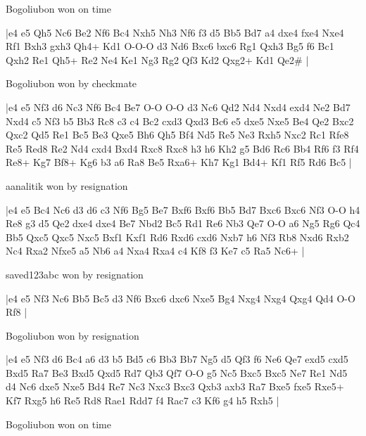 \showboard

Bogoliubon won on time

\makegametitle
|e4 e5 Qh5 Nc6 Be2 Nf6 Bc4 Nxh5 Nh3 Nf6 f3 d5 Bb5 Bd7 a4 dxe4 fxe4 Nxe4 Rf1 Bxh3 gxh3 Qh4+ Kd1 O-O-O d3 Nd6 Bxc6 bxc6 Rg1 Qxh3 Bg5 f6 Bc1 Qxh2 Re1 Qh5+ Re2 Ne4 Ke1 Ng3 Rg2 Qf3 Kd2 Qxg2+ Kd1 Qe2\#  |

\showboard

Bogoliubon won by checkmate

\makegametitle
|e4 e5 Nf3 d6 Nc3 Nf6 Bc4 Be7 O-O O-O d3 Nc6 Qd2 Nd4 Nxd4 exd4 Ne2 Bd7 Nxd4 c5 Nf3 b5 Bb3 Rc8 c3 c4 Bc2 cxd3 Qxd3 Bc6 e5 dxe5 Nxe5 Be4 Qe2 Bxc2 Qxc2 Qd5 Re1 Bc5 Be3 Qxe5 Bh6 Qh5 Bf4 Nd5 Re5 Ne3 Rxh5 Nxc2 Rc1 Rfe8 Re5 Red8 Re2 Nd4 cxd4 Bxd4 Rxc8 Rxc8 h3 h6 Kh2 g5 Bd6 Rc6 Bb4 Rf6 f3 Rf4 Re8+ Kg7 Bf8+ Kg6 b3 a6 Ra8 Be5 Rxa6+ Kh7 Kg1 Bd4+ Kf1 Rf5 Rd6 Bc5  |

\showboard

aanalitik won by resignation

\makegametitle
|e4 e5 Bc4 Nc6 d3 d6 c3 Nf6 Bg5 Be7 Bxf6 Bxf6 Bb5 Bd7 Bxc6 Bxc6 Nf3 O-O h4 Re8 g3 d5 Qe2 dxe4 dxe4 Be7 Nbd2 Bc5 Rd1 Re6 Nb3 Qe7 O-O a6 Ng5 Rg6 Qc4 Bb5 Qxc5 Qxc5 Nxc5 Bxf1 Kxf1 Rd6 Rxd6 cxd6 Nxb7 h6 Nf3 Rb8 Nxd6 Rxb2 Nc4 Rxa2 Nfxe5 a5 Nb6 a4 Nxa4 Rxa4 c4 Kf8 f3 Ke7 c5 Ra5 Nc6+  |

\showboard

saved123abc won by resignation

\makegametitle
|e4 e5 Nf3 Nc6 Bb5 Bc5 d3 Nf6 Bxc6 dxc6 Nxe5 Bg4 Nxg4 Nxg4 Qxg4 Qd4 O-O Rf8  |

\showboard

Bogoliubon won by resignation

\makegametitle
|e4 e5 Nf3 d6 Bc4 a6 d3 b5 Bd5 c6 Bb3 Bb7 Ng5 d5 Qf3 f6 Ne6 Qe7 exd5 cxd5 Bxd5 Ra7 Be3 Bxd5 Qxd5 Rd7 Qb3 Qf7 O-O g5 Nc5 Bxc5 Bxc5 Ne7 Re1 Nd5 d4 Nc6 dxe5 Nxe5 Bd4 Re7 Nc3 Nxc3 Bxc3 Qxb3 axb3 Ra7 Bxe5 fxe5 Rxe5+ Kf7 Rxg5 h6 Re5 Rd8 Rae1 Rdd7 f4 Rac7 c3 Kf6 g4 h5 Rxh5  |

\showboard

Bogoliubon won on time

